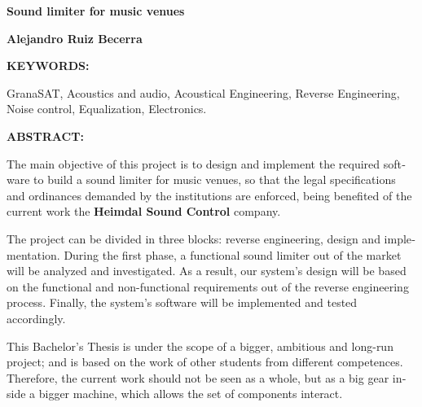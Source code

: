 \begin{otherlanguage}{english}

\begin{center}
\textbf{\Large Sound limiter for music venues}
\par\end{center}{\Large \par}

\begin{center}
\textbf{\large Alejandro Ruiz Becerra}
\par\end{center}{\large \par}

\vspace{0.75cm}
\begin{doublespace}
\noindent \textbf{KEYWORDS:}
\end{doublespace}

\begin{singlespace}

    \noindent GranaSAT, Acoustics and audio, Acoustical Engineering, Reverse Engineering, Noise control, Equalization, Electronics.

\end{singlespace}

\begin{doublespace}
\noindent \textbf{ABSTRACT:}
\end{doublespace}

\begin{singlespace}

    \noindent The main objective of this project is to design and implement the required software to build a sound limiter for music venues, so that the legal specifications and ordinances demanded by the institutions are enforced, being benefited of the current work the \textbf{Heimdal Sound Control} company.

    \noindent The project can be divided in three blocks: reverse engineering, design and implementation. During the first phase, a functional sound limiter out of the market will be analyzed and investigated. As a result, our system's design will be based on the functional and non-functional requirements out of the reverse engineering process. Finally, the system's software will be implemented and tested accordingly.

    \noindent This Bachelor's Thesis is under the scope of a bigger, ambitious and long-run project; and is based on the work of other students from different competences. Therefore, the current work should not be seen as a whole, but as a big gear inside a bigger machine, which allows the set of components interact.


\end{singlespace}
\end{otherlanguage}

